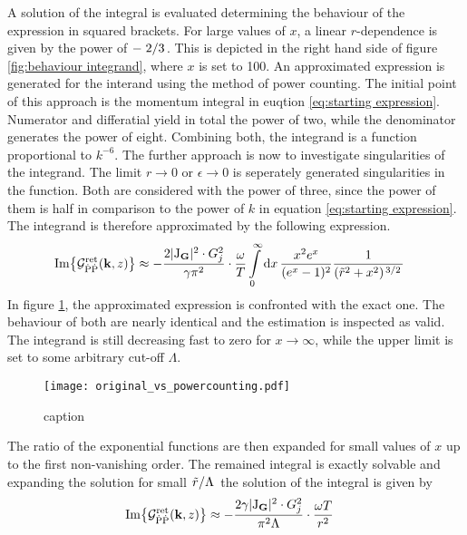 %
A solution of the integral is evaluated determining the behaviour of the expression in squared brackets.
For large values of $x$, a linear $r$-dependence is given by the power of $-\flatfrac{2}{3}$.
This is depicted in the right hand side of figure \ref{fig:behaviour integrand}, where $x$ is set to 100.
An approximated expression is generated for the interand using the method of power counting.
The initial point of this approach is the momentum integral in euqtion \eqref{eq:starting expression}.
Numerator and differatial yield in total the power of two, while the denominator generates the power of eight.
Combining both, the integrand is a function proportional to $k^{-6}$.
The further approach is now to investigate singularities of the integrand.
The limit $r \to 0$ or $\epsilon \to 0$ is seperately generated singularities in the function.
Both are considered with the power of three, since the power of them is half in comparison to the power of $k$ in equation \eqref{eq:starting expression}.
The integrand is therefore approximated by the following expression.
%
\begin{align}
	\Im{\mathcal{G}_{\dot{\mt{P}}\dot{\mt{P}}}^{\mt{ret}}(\vb{k}, z)} &\approx 
		-\frac{2 \vert \mt{J}_{\vb{G}} \vert^{2} \cdot G_{j}^{2}}{\gamma \pi^{2}} \cdot 
		\frac{\omega}{T}
		\int\limits_{0}^{\infty} \dd{x}
		\frac{x^{2} e^{x}}{(e^{x} - 1)^{2}}
		\frac{1}{(\tilde{r}^{2} + x^{2})^{\flatfrac{3}{2}}}
\end{align}
%
In figure \ref{fig:integrand exact vs approx}, the approximated expression is confronted with the exact one.
The behaviour of both are nearly identical and the estimation is inspected as valid.
The integrand is still decreasing fast to zero for $x \to \infty$, while the upper limit is set to some arbitrary cut-off $\Lambda$.
%
\begin{figure}[t]
	\centering
	\texttt{[image: original\_vs\_powercounting.pdf]}
	\caption{caption}
	\label{fig:integrand exact vs approx}
\end{figure}
%
The ratio of the exponential functions are then expanded for small values of $x$ up to the first non-vanishing order.
The remained integral is exactly solvable and expanding the solution for small $\flatfrac{\tilde{r}}{\Lambda}$ the solution of the integral is given by
%
\begin{align}
	\Im{\mathcal{G}_{\dot{\mathrm{P}}\dot{\mathrm{P}}}^{\mathrm{ret}}(\vb{k}, z)} &\approx 
		-\frac{2 \gamma \vert \mathrm{J}_{\vb{G}} \vert^{2} \cdot G_{j}^{2}}{\pi^{2} \Lambda} \cdot \frac{\omega T}{r^{2}}
\end{align}
